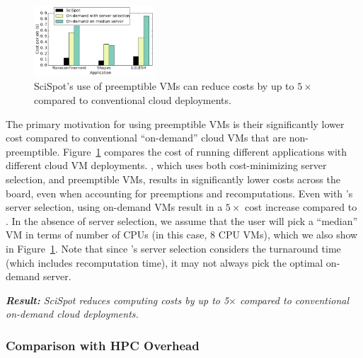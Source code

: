 \begin{figure}
  \centering
  \includegraphics[width=0.4\textwidth]{../graphs/cost-only-bar.pdf}
  \vspace*{\myfigspace}
  \caption{SciSpot's use of preemptible VMs can reduce costs by up to $5\times$ compared to conventional cloud deployments.}
  \label{fig:cost-only-bar}
    \vspace*{\myfigspace}
\end{figure}


The primary motivation for using preemptible VMs is their significantly lower cost compared to conventional ``on-demand'' cloud VMs that are non-preemptible. 
Figure~\ref{fig:cost-only-bar} compares the cost of running different applications with different cloud VM deployments.
\sysname, which uses both cost-minimizing server selection, and preemptible VMs, results in significantly lower costs across the board, even when accounting for preemptions and recomputations. 
Even with \sysname's server selection, using on-demand VMs result in a $5\times$ cost increase compared to \sysname.
In the absence of server selection, we assume that the user will pick a ``median'' VM in terms of number of CPUs (in this case, 8 CPU VMs), which we also show in Figure~\ref{fig:cost-only-bar}.
Note that since \sysname's server selection considers the turnaround time (which includes recomputation time), it may not always pick the optimal on-demand server. 



\noindent \emph{\textbf{Result:} SciSpot reduces computing costs by up to 5$\times$ compared to conventional on-demand cloud deployments.}

\subsubsection{Comparison with HPC Overhead}

